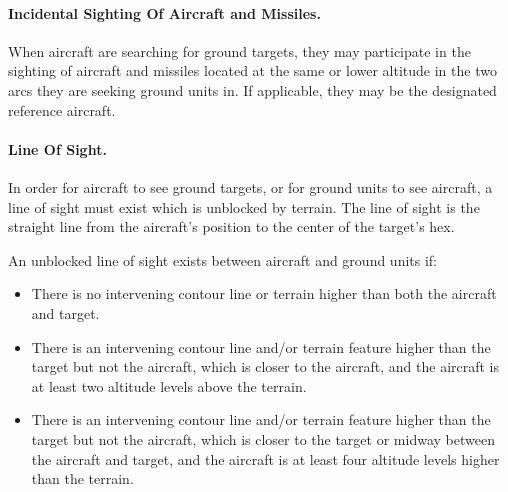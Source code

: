 

\paragraph{Incidental Sighting Of Aircraft and Missiles.} When aircraft are searching for ground targets, they may participate in the sighting of aircraft and missiles located at the same or lower altitude in the two arcs they are seeking ground units in. If applicable, they may be the designated reference aircraft.

\paragraph{Line Of Sight.} In order for aircraft to see ground targets, or for ground units to see aircraft, a line of sight must exist which is unblocked by terrain. The line of sight is the straight line from the aircraft's position to the center of the target's hex.

An unblocked line of sight exists between aircraft and ground units if:

\begin{itemize}
    \item There is no intervening contour line or terrain higher than both the aircraft and target.
    \item There is an intervening contour line and/or terrain feature higher than the target but not the aircraft, which is closer to the aircraft, and the aircraft is at least two altitude levels above the terrain.
    \item There is an intervening contour line and/or terrain feature higher than the target but not the aircraft, which is closer to the target or midway between the aircraft and target, and the aircraft is at least four altitude levels higher than the terrain.
\end{itemize}

